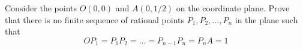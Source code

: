 Consider the points $O(0,0)$ and $A(0,1/ 2)$ on the coordinate plane. Prove that there is no finite sequence of rational points $P_1,P_2,\ldots ,P_n$ in the plane such that\[OP_1=P_1P_2=\ldots =P_{n-1}P_n=P_nA=1 \]